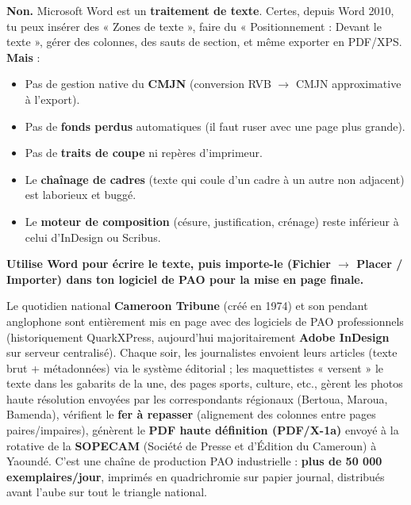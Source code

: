 \documentclass[11pt]{article}
\begin{document}
\begin{attention}
\textbf{Non.} Microsoft Word est un \textbf{traitement de texte}. Certes, depuis Word 2010, tu peux insérer des « Zones de texte », faire du « Positionnement : Devant le texte », gérer des colonnes, des sauts de section, et même exporter en PDF/XPS. \textbf{Mais} :
\begin{itemize}
    \item Pas de gestion native du \textbf{CMJN} (conversion RVB $\rightarrow$ CMJN approximative à l'export).
    \item Pas de \textbf{fonds perdus} automatiques (il faut ruser avec une page plus grande).
    \item Pas de \textbf{traits de coupe} ni repères d'imprimeur.
    \item Le \textbf{chaînage de cadres} (texte qui coule d'un cadre à un autre non adjacent) est laborieux et buggé.
    \item Le \textbf{moteur de composition} (césure, justification, crénage) reste inférieur à celui d'InDesign ou Scribus.
\end{itemize}
\textbf{Utilise Word pour écrire le texte, puis importe-le (Fichier $\rightarrow$ Placer / Importer) dans ton logiciel de PAO pour la mise en page finale.}
\end{attention}

\begin{savaistu}
Le quotidien national \textbf{Cameroon Tribune} (créé en 1974) et son pendant anglophone sont entièrement mis en page avec des logiciels de PAO professionnels (historiquement QuarkXPress, aujourd'hui majoritairement \textbf{Adobe InDesign} sur serveur centralisé). Chaque soir, les journalistes envoient leurs articles (texte brut + métadonnées) via le système éditorial ; les maquettistes « versent » le texte dans les gabarits de la une, des pages sports, culture, etc., gèrent les photos haute résolution envoyées par les correspondants régionaux (Bertoua, Maroua, Bamenda), vérifient le \textbf{fer à repasser} (alignement des colonnes entre pages paires/impaires), génèrent le \textbf{PDF haute définition (PDF/X-1a)} envoyé à la rotative de la \textbf{SOPECAM} (Société de Presse et d'Édition du Cameroun) à Yaoundé. C'est une chaîne de production PAO industrielle : \textbf{plus de 50 000 exemplaires/jour}, imprimés en quadrichromie sur papier journal, distribués avant l'aube sur tout le triangle national.
\end{savaistu}
\end{document}
